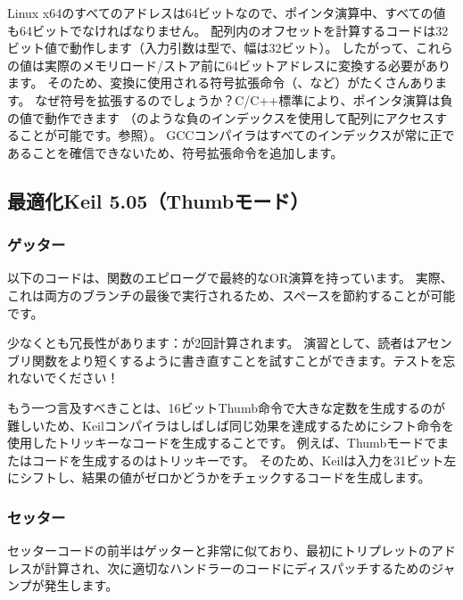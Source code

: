 Linux x64のすべてのアドレスは64ビットなので、ポインタ演算中、すべての値も64ビットでなければなりません。
配列内のオフセットを計算するコードは32ビット値で動作します（入力引数は型で、幅は32ビット）。
したがって、これらの値は実際のメモリロード/ストア前に64ビットアドレスに変換する必要があります。
そのため、変換に使用される符号拡張命令（、など）がたくさんあります。
なぜ符号を拡張するのでしょうか？C/C++標準により、ポインタ演算は負の値で動作できます
（のような負のインデックスを使用して配列にアクセスすることが可能です。参照）。
GCCコンパイラはすべてのインデックスが常に正であることを確信できないため、符号拡張命令を追加します。

\subsection{最適化Keil 5.05（Thumbモード）}

\subsubsection{ゲッター}

以下のコードは、関数のエピローグで最終的なOR演算を持っています。
実際、これは両方のブランチの最後で実行されるため、スペースを節約することが可能です。



少なくとも冗長性があります：が2回計算されます。
演習として、読者はアセンブリ関数をより短くするように書き直すことを試すことができます。テストを忘れないでください！

もう一つ言及すべきことは、16ビットThumb命令で大きな定数を生成するのが難しいため、Keilコンパイラはしばしば同じ効果を達成するためにシフト命令を使用したトリッキーなコードを生成することです。
例えば、Thumbモードでまたはコードを生成するのはトリッキーです。
そのため、Keilは入力を31ビット左にシフトし、結果の値がゼロかどうかをチェックするコードを生成します。

\subsubsection{セッター}

セッターコードの前半はゲッターと非常に似ており、最初にトリプレットのアドレスが計算され、次に適切なハンドラーのコードにディスパッチするためのジャンプが発生します。

